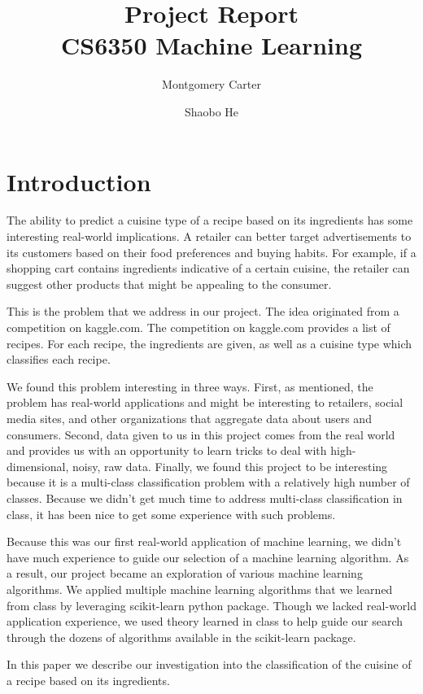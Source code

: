 \documentclass[11pt]{article}
\title{Project Report\\CS6350 Machine Learning}
\author{Montgomery Carter \and Shaobo He}
\date{\vspace{-5ex}}
\begin{document}
\maketitle

\section{Introduction}
The ability to predict a cuisine type of a recipe based on its
ingredients has some interesting real-world implications.  A retailer
can better target advertisements to its customers based on their food
preferences and buying habits.  For example, if a shopping cart
contains ingredients indicative of a certain cuisine, the retailer can
suggest other products that might be appealing to the consumer.

This is the problem that we address in our project.  The idea
originated from a competition on kaggle.com\cite{kaggle-link}. The
competition on  kaggle.com provides a list of recipes.  For each
recipe, the ingredients are given, as well as a cuisine type which
classifies each recipe.

We found this problem interesting in three ways. First, as mentioned,
the problem has real-world applications and might be interesting to
retailers, social media sites, and other organizations that aggregate
data about users and consumers.  Second, data given to us in this
project comes from the real world and provides us with an opportunity
to learn tricks to deal with high-dimensional, noisy, raw data.
Finally, we found this project to be interesting because it is a
multi-class classification problem with a relatively high number of
classes.  Because we didn't get much time to address multi-class
classification in class, it has been nice to get some experience with
such problems. 

Because this was our first real-world application of machine learning,
we didn't have much experience to guide our selection of a machine
learning algorithm.  As a result, our project became an exploration of
various machine learning algorithms.  We applied multiple machine
learning algorithms that we learned from class by leveraging
scikit-learn python package. Though we lacked real-world application
experience, we used theory learned in class to help guide our search
through the dozens of algorithms available in the scikit-learn
package.

In this paper we describe our investigation into the classification of
the cuisine of a recipe based on its ingredients.
\end{document}
